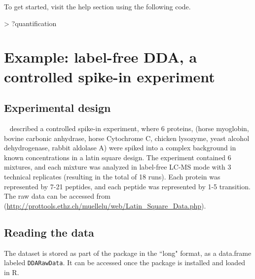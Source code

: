 \documentclass[11pt]{article}
\begin{document}
To get started, visit the help section using the following code.
\begin{small}
\begin{Schunk}
\begin{Sinput}
> ?quantification
\end{Sinput}
\end{Schunk}
\end{small}


\clearpage
\section{Example: label-free DDA, a controlled spike-in experiment}

\subsection{Experimental design}

~\cite{Mueller:2007fo} described a controlled spike-in experiment, where 6 proteins, (horse myoglobin, bovine carbonic anhydrase, horse Cytochrome C, chicken lysozyme, yeast alcohol dehydrogenase, rabbit aldolase A) were spiked into a complex background in known concentrations in a latin square design. The experiment contained 6 mixtures, and each mixture was analyzed in label-free LC-MS mode with 3 technical replicates (resulting in the total of 18 runs). Each protein was represented by 7-21 peptides, and each peptide was represented by 1-5 transition. The raw data can be accessed from (\url{http://prottools.ethz.ch/muellelu/web/Latin\_Square\_Data.php}).


\subsection{Reading the data \label{sec:DDAreading}}

The dataset is stored as part of the package in the ``long" format, as a data.frame labeled {\tt DDARawData}. It can be accessed once the package is installed and loaded in R.
\end{document}
